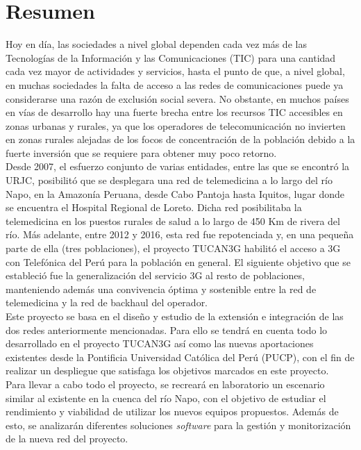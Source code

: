 \chapter*{Resumen}
\thispagestyle{empty}
\label{cap:resumen}

Hoy en día, las sociedades a nivel global dependen cada vez más de las Tecnologías de la Información y las Comunicaciones (TIC) para una cantidad cada vez mayor de actividades y servicios, hasta el punto de que, a nivel global, en muchas sociedades la falta de acceso a las redes de comunicaciones puede ya considerarse una razón de exclusión social severa. No obstante, en muchos países en vías de desarrollo hay una fuerte brecha entre los recursos TIC accesibles en zonas urbanas y rurales, ya que los operadores de telecomunicación no invierten en zonas rurales alejadas de los focos de concentración de la población debido a la fuerte inversión que se requiere para obtener muy poco retorno.\\

Desde 2007, el esfuerzo conjunto de varias entidades, entre las que se encontró la URJC, posibilitó que se desplegara una red de telemedicina a lo largo del río Napo, en la Amazonía Peruana, desde Cabo Pantoja hasta Iquitos, lugar donde se encuentra el Hospital Regional de Loreto. Dicha red posibilitaba la telemedicina en los puestos rurales de salud a lo largo de 450 Km de rivera del río. Más adelante, entre 2012 y 2016, esta red fue repotenciada y, en una pequeña parte de ella (tres poblaciones), el proyecto TUCAN3G habilitó el acceso a 3G con Telefónica del Perú para la población en general. El siguiente objetivo que se estableció fue la generalización del servicio 3G al resto de poblaciones, manteniendo además una convivencia óptima y sostenible entre la red de telemedicina y la red de backhaul del operador.\\

Este proyecto se basa en el diseño y estudio de la extensión e integración de las dos redes anteriormente mencionadas. Para ello se tendrá en cuenta todo lo desarrollado en el proyecto TUCAN3G así como las nuevas aportaciones existentes desde la Pontificia Universidad Católica del Perú (PUCP), con el fin de realizar un despliegue que satisfaga los objetivos marcados en este proyecto.\\

Para llevar a cabo todo el proyecto, se recreará en laboratorio un escenario similar al existente en la cuenca del río Napo, con el objetivo de estudiar el rendimiento y viabilidad de utilizar los nuevos equipos propuestos. Además de esto, se analizarán diferentes soluciones \textit{software} para la gestión y monitorización de la nueva red del proyecto.\\

\nocite{simo2015sharing}
\nocite{bebea2010diseno}
\nocite{martinez2016tucan3g}
\nocite{rey2011telemedicine}
\nocite{botta2013d}
\nocite{salguero2009propuesta}
\nocite{tucan3gd52}
\nocite{tucan3gd51}
\nocite{molisch2012wireless}
\nocite{nstremeFigures}
\nocite{ijcat}
\nocite{gsyc}
\nocite{eccs}
\nocite{miro}

\afterpage{\null\newpage}